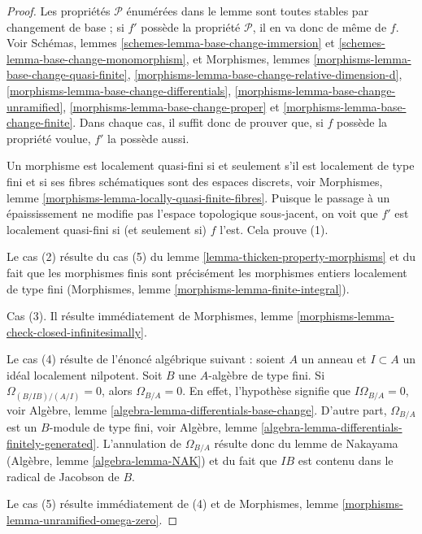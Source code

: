 \begin{proof}
Les propriétés $\mathcal{P}$ énumérées dans le lemme sont toutes stables
par changement de base ; si $f'$ possède la propriété $\mathcal{P}$,
il en va donc de même de $f$. Voir
Schémas, lemmes \ref{schemes-lemma-base-change-immersion} et
\ref{schemes-lemma-base-change-monomorphism},
et
Morphismes, lemmes
\ref{morphisms-lemma-base-change-quasi-finite},
\ref{morphisms-lemma-base-change-relative-dimension-d},
\ref{morphisms-lemma-base-change-differentials},
\ref{morphisms-lemma-base-change-unramified},
\ref{morphisms-lemma-base-change-proper} et
\ref{morphisms-lemma-base-change-finite}.
Dans chaque cas, il suffit donc de prouver que, si $f$ possède
la propriété voulue, $f'$ la possède aussi.

\medskip\noindent
Un morphisme est localement quasi-fini si et seulement s'il est localement
de type fini et si ses fibres schématiques sont des espaces discrets, voir
Morphismes, lemme \ref{morphisms-lemma-locally-quasi-finite-fibres}.
Puisque le passage à un épaississement ne modifie pas
l'espace topologique sous-jacent, on voit que $f'$ est localement quasi-fini si
(et seulement si) $f$ l'est. Cela prouve (1).

\medskip\noindent
Le cas (2) résulte du cas (5) du lemme \ref{lemma-thicken-property-morphisms}
et du fait que les morphismes finis sont précisément
les morphismes entiers localement de type fini
(Morphismes, lemme \ref{morphisms-lemma-finite-integral}).

\medskip\noindent
Cas (3). Il résulte immédiatement de
Morphismes, lemme \ref{morphisms-lemma-check-closed-infinitesimally}.

\medskip\noindent
Le cas (4) résulte de l'énoncé algébrique suivant : soient $A$ un anneau et
$I \subset A$ un idéal localement nilpotent. Soit $B$ une
$A$-algèbre de type fini. Si $\Omega_{(B/IB)/(A/I)} = 0$, alors $\Omega_{B/A} = 0$.
En effet, l'hypothèse signifie que $I\Omega_{B/A} = 0$, voir
Algèbre, lemme \ref{algebra-lemma-differentials-base-change}.
D'autre part, $\Omega_{B/A}$ est un $B$-module de type fini, voir
Algèbre, lemme \ref{algebra-lemma-differentials-finitely-generated}.
L'annulation de $\Omega_{B/A}$ résulte donc du lemme de
Nakayama (Algèbre, lemme \ref{algebra-lemma-NAK}) et du fait
que $IB$ est contenu dans le radical de Jacobson de $B$.

\medskip\noindent
Le cas (5) résulte immédiatement de (4) et de
Morphismes, lemme \ref{morphisms-lemma-unramified-omega-zero}.


\end{proof}
